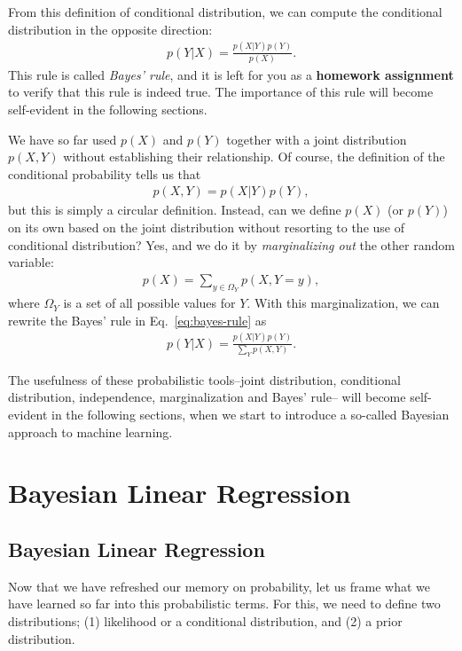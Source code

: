\documentclass{report}
\begin{document}
From this definition of conditional distribution, we can compute the conditional
distribution in the opposite direction:
\begin{align}
    \label{eq:bayes-rule}
    p(Y|X) = \frac{p(X|Y)p(Y)}{p(X)}.
\end{align}
This rule is called {\it Bayes' rule}, and it is left for you as a {\bf homework
assignment} to verify that this rule is indeed true. The importance of this rule
will become self-evident in the following sections.

We have so far used $p(X)$ and $p(Y)$ together with a joint distribution
$p(X,Y)$ without establishing their relationship. Of course, the definition of
the conditional probability tells us that 
\begin{align*}
    p(X,Y) = p(X|Y)p(Y),
\end{align*}
but this is simply a circular definition. Instead, can we define $p(X)$ (or
$p(Y)$) on its own based on the joint distribution without resorting to the use
of conditional distribution?  Yes, and we do it by {\it marginalizing out} the
other random variable:
\begin{align}
    \label{eq:marginal}
    p(X) = \sum_{y \in \Omega_Y} p(X, Y=y),
\end{align}
where $\Omega_Y$ is a set of all possible values for $Y$. With this
marginalization, we can rewrite the Bayes' rule in Eq.~\eqref{eq:bayes-rule} as
\begin{align*}
    p(Y|X) = \frac{p(X|Y)p(Y)}{\sum_{Y} p(X, Y)}.
\end{align*}

The usefulness of these probabilistic tools--joint distribution, conditional
distribution, independence, marginalization and Bayes' rule-- will become
self-evident in the following sections, when we start to introduce a so-called
Bayesian approach to machine learning.


\section{Bayesian Linear Regression}

\subsection{Bayesian Linear Regression}

Now that we have refreshed our memory on probability, let us frame what we have
learned so far into this probabilistic terms. For this, we need to define two
distributions; (1) likelihood or a conditional distribution, and (2) a prior
distribution. 
\end{document}

